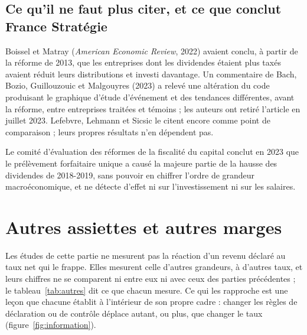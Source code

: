 \documentclass[11pt,a4paper]{article}
\begin{document}
\subsection{Ce qu'il ne faut plus citer, et ce que conclut France Stratégie}

Boissel et Matray (\emph{American Economic Review}, 2022) avaient conclu, à partir de la réforme de
2013, que les entreprises dont les dividendes étaient plus taxés avaient réduit leurs distributions
et investi davantage. Un commentaire de Bach, Bozio, Guillouzouic et Malgouyres (2023) a relevé une
altération du code produisant le graphique d'étude d'événement et des tendances différentes, avant la
réforme, entre entreprises traitées et témoins ; les auteurs ont retiré l'article en juillet 2023.
Lefebvre, Lehmann et Sicsic le citent encore comme point de comparaison ; leurs propres résultats
n'en dépendent pas.

Le comité d'évaluation des réformes de la fiscalité du capital conclut en 2023 que le prélèvement
forfaitaire unique a causé la majeure partie de la hausse des dividendes de 2018-2019, sans pouvoir
en chiffrer l'ordre de grandeur macroéconomique, et ne détecte d'effet ni sur l'investissement ni sur
les salaires.

\section{Autres assiettes et autres marges}

Les études de cette partie ne mesurent pas la réaction d'un revenu déclaré au taux net qui le
frappe. Elles mesurent celle d'autres grandeurs, à d'autres taux, et leurs chiffres ne se comparent
ni entre eux ni avec ceux des parties précédentes ; le tableau~\ref{tab:autres} dit ce que chacun
mesure. Ce qui les rapproche est une leçon que chacune établit à l'intérieur de son propre cadre :
changer les règles de déclaration ou de contrôle déplace autant, ou plus, que changer le taux
(figure~\ref{fig:information}).
\end{document}
